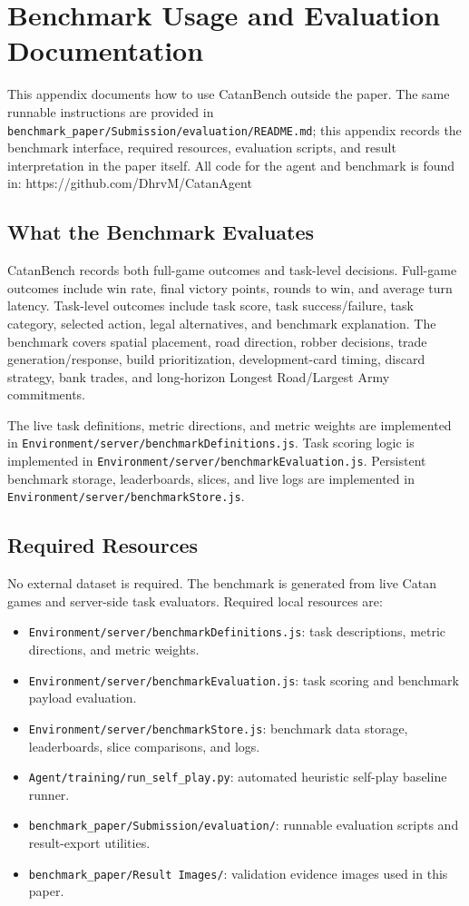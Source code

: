 \documentclass{article}
\begin{document}
\section{Benchmark Usage and Evaluation Documentation}
\label{app:benchmark-usage-documentation}

This appendix documents how to use CatanBench outside the paper. The same runnable instructions are provided in \texttt{benchmark\_paper/Submission/evaluation/README.md}; this appendix records the benchmark interface, required resources, evaluation scripts, and result interpretation in the paper itself.
All code for the agent and benchmark is found in: https://github.com/DhrvM/CatanAgent

\subsection{What the Benchmark Evaluates}

CatanBench records both full-game outcomes and task-level decisions. Full-game outcomes include win rate, final victory points, rounds to win, and average turn latency. Task-level outcomes include task score, task success/failure, task category, selected action, legal alternatives, and benchmark explanation. The benchmark covers spatial placement, road direction, robber decisions, trade generation/response, build prioritization, development-card timing, discard strategy, bank trades, and long-horizon Longest Road/Largest Army commitments.

The live task definitions, metric directions, and metric weights are implemented in \texttt{Environment/server/benchmarkDefinitions.js}. Task scoring logic is implemented in \texttt{Environment/server/benchmarkEvaluation.js}. Persistent benchmark storage, leaderboards, slices, and live logs are implemented in \texttt{Environment/server/benchmarkStore.js}.
\subsection{Required Resources}

No external dataset is required. The benchmark is generated from live Catan games and server-side task evaluators. Required local resources are:
\begin{itemize}
    \item \texttt{Environment/server/benchmarkDefinitions.js}: task descriptions, metric directions, and metric weights.
    \item \texttt{Environment/server/benchmarkEvaluation.js}: task scoring and benchmark payload evaluation.
    \item \texttt{Environment/server/benchmarkStore.js}: benchmark data storage, leaderboards, slice comparisons, and logs.
    \item \texttt{Agent/training/run\_self\_play.py}: automated heuristic self-play baseline runner.
    \item \texttt{benchmark\_paper/Submission/evaluation/}: runnable evaluation scripts and result-export utilities.
    \item \texttt{benchmark\_paper/Result Images/}: validation evidence images used in this paper.
\end{itemize}
\end{document}
